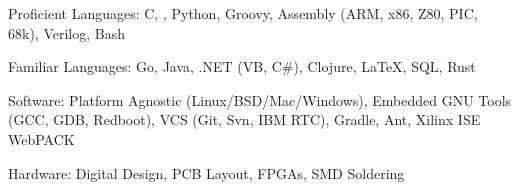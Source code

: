 \begin{indentsection}{\parindent}
\begin{description*}
	\item[Proficient Languages:]
    C, \CPP, Python, Groovy, Assembly (ARM, x86, Z80, PIC, 68k), Verilog, Bash
	\item[Familiar Languages:]
    Go, Java, .NET (VB, C\#), Clojure, \LaTeX, SQL, Rust
	\item[Software:]
    Platform Agnostic (Linux/BSD/Mac/Windows), Embedded GNU Tools (GCC, GDB, Redboot), VCS (Git, Svn, IBM RTC), Gradle, Ant, Xilinx ISE WebPACK
	\item[Hardware:]
    Digital Design, PCB Layout, FPGAs, SMD Soldering 
\end{description*}
\end{indentsection}
